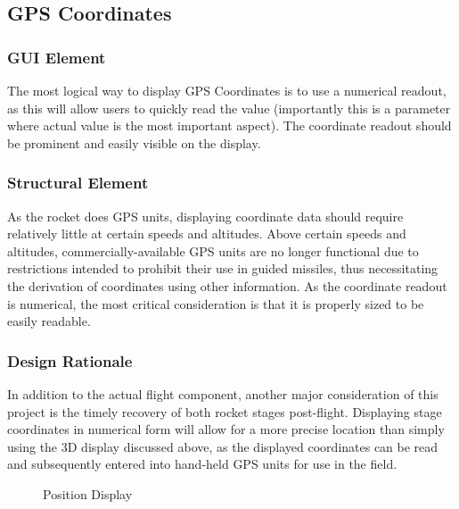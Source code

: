 \documentclass[journal,10pt,onecolumn,compsoc]{IEEEtran}
\begin{document}
  \subsection{GPS Coordinates}

		\subsubsection{GUI Element}
			The most logical way to display GPS Coordinates is to use a numerical readout, as this will allow users to quickly read the value (importantly this is a parameter where actual value is the most important aspect).
			The coordinate readout should be prominent and easily visible on the display.

		\subsubsection{Structural Element}
			As the rocket does GPS units, displaying coordinate data should require relatively little at certain speeds and altitudes.
			Above certain speeds and altitudes, commercially-available GPS units are no longer functional due to restrictions intended to prohibit their use in guided missiles, thus necessitating the derivation of coordinates using other information.
			As the coordinate readout is numerical, the most critical consideration is that it is properly sized to be easily readable.
			
		\subsubsection{Design Rationale}
      In addition to the actual flight component, another major consideration of this project is the timely recovery of both rocket stages post-flight.
      Displaying stage coordinates in numerical form will allow for a more precise location than simply using the 3D display discussed above, as the displayed coordinates can be read and subsequently entered into hand-held GPS units for use in the field.

      
\begin{figure}[H]
\centering
{}
\caption{Position Display}
\end{figure} 
	
\end{document}
